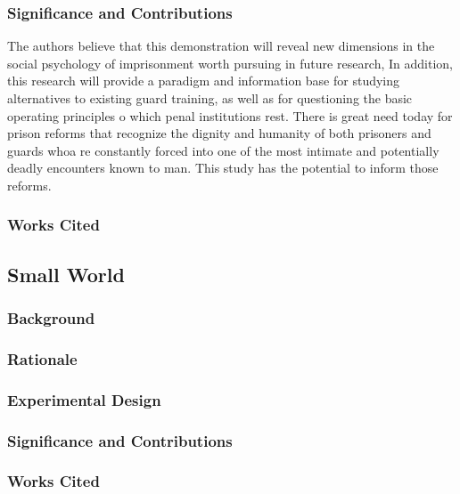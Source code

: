 \subsubsection{Significance and Contributions}
\label{significanceandcontributions}

The authors believe that this demonstration will reveal new dimensions in the social psychology of imprisonment worth pursuing in future research, In addition, this research will provide a paradigm and information base for studying alternatives to existing guard training, as well as for questioning the basic operating principles o which penal institutions rest. There is great need today for prison reforms that recognize the dignity and humanity of both prisoners and guards whoa re constantly forced into one of the most intimate and potentially deadly encounters known to man. This study has the potential to inform those reforms.

\subsubsection{Works Cited}
\label{workscited}

\newpage

\subsection{Small World}
\label{smallworld}

\subsubsection{Background}
\label{background}

\subsubsection{Rationale}
\label{rationale}

\subsubsection{Experimental Design}
\label{experimentaldesign}

\subsubsection{Significance and Contributions}
\label{significanceandcontributions}

\subsubsection{Works Cited}
\label{workscited}

